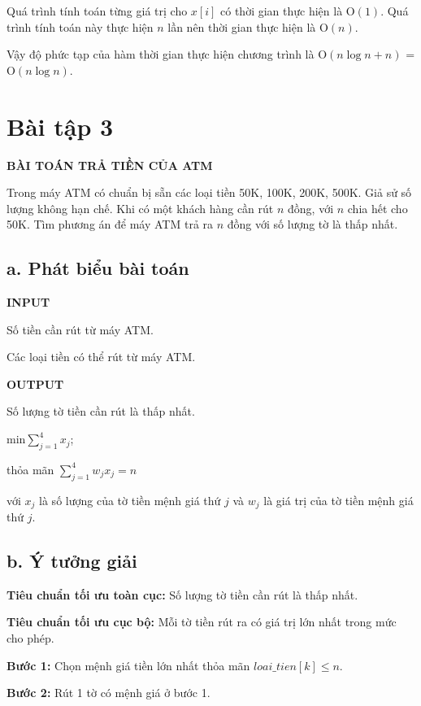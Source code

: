 \documentclass[12pt, a4paper, fleqn]{article}
\begin{document}
	Quá trình tính toán từng giá trị cho $x[i]$ có thời gian thực hiện là O$(1)$. Quá trình tính toán này thực hiện $n$ lần nên thời gian thực hiện là O$(n)$.
	
	Vậy độ phức tạp của hàm thời gian thực hiện chương trình là O$(n \log n + n)$ = O$(n \log n)$.
	
	\clearpage
	
	\section*{Bài tập 3}
	
	
	\textbf{BÀI TOÁN TRẢ TIỀN CỦA ATM}
	
	Trong máy ATM có chuẩn bị sẵn các loại tiền	50K, 100K, 200K, 500K. Giả sử số lượng không hạn chế. Khi có một khách hàng cần rút $n$ đồng, với $n$ chia hết cho 50K. Tìm phương án để máy ATM trả ra $n$ đồng với số lượng tờ là thấp nhất.
	
	\subsection*{a. Phát biểu bài toán}
	
	\textbf{INPUT}
	
	Số tiền cần rút từ máy ATM.
	
	Các loại tiền có thể rút từ máy ATM.
	
	\textbf{OUTPUT}
	
	Số lượng tờ tiền cần rút là thấp nhất.
	
	min$\displaystyle \sum _{j=1}^{4}x_{j}$;
	
	thỏa mãn $\displaystyle \sum _{{j=1}}^{4}w_{j}x_{j}=n$
	
	với $x_j$ là số lượng của tờ tiền mệnh giá thứ $j$ và $w_j$ là giá trị của tờ tiền mệnh giá thứ $j$.
	
	\subsection*{b. Ý tưởng giải}
	
	\textbf{Tiêu chuẩn tối ưu toàn cục:} Số lượng tờ tiền cần rút là thấp nhất.
	
	\textbf{Tiêu chuẩn tối ưu cục bộ:} Mỗi tờ tiền rút ra có giá trị lớn nhất trong mức cho phép.
	
	\textbf{Bước 1:} Chọn mệnh giá tiền lớn nhất thỏa mãn $loai\_tien[k] \leq n$.
	
	\textbf{Bước 2:} Rút 1 tờ có mệnh giá ở bước 1.
	
\end{document}

